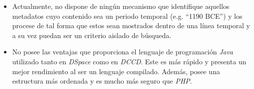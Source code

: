 \begin{itemize}
\tightlist
\item
  Actualmente, no dispone de ningún mecanismo que identifique aquellos
  metadatos cuyo contenido sea un periodo temporal (e.g. ``1190 BCE'') y
  los procese de tal forma que estos sean mostrados dentro de una línea
  temporal y a su vez puedan ser un criterio aislado de búsqueda.
\item
  No posee las ventajas que proporciona el lenguaje de programación
  \emph{Java} utilizado tanto en \emph{DSpace} como en \emph{DCCD}. Este
  es más rápido y presenta un mejor rendimiento al ser un lenguaje
  compilado. Además, posee una estructura más ordenada y es mucho más
  seguro que \emph{PHP}.
\end{itemize}
